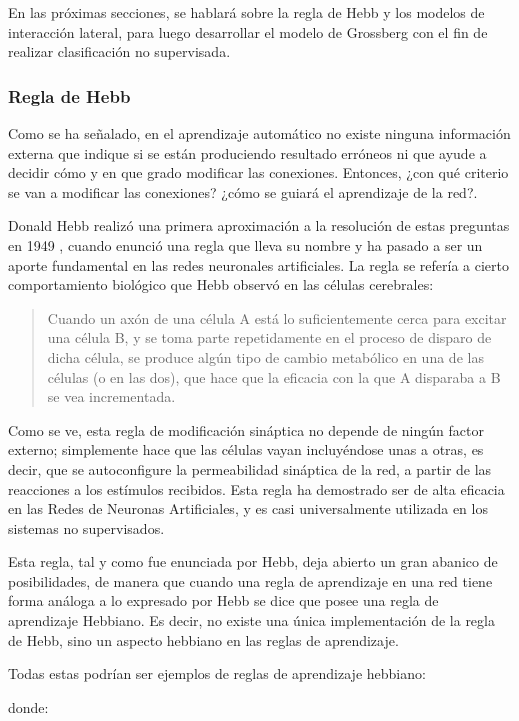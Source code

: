 En las próximas secciones, se hablará sobre la regla de Hebb y los modelos de interacción lateral, para luego desarrollar el modelo de Grossberg con el fin de realizar clasificación no supervisada. 

\subsubsection{Regla de Hebb}

Como se ha señalado, en el aprendizaje automático no existe ninguna información externa que indique si se están produciendo resultado erróneos ni que ayude a decidir cómo y en que grado modificar las conexiones. Entonces, ¿con qué criterio se van a modificar las conexiones? ¿cómo se guiará el aprendizaje de la red?.

Donald Hebb realizó una primera aproximación a la resolución de estas preguntas en 1949 \cite{hebb2002}, cuando enunció una regla que lleva su nombre y ha pasado a ser un aporte fundamental en las redes neuronales artificiales. La regla se refería a cierto comportamiento biológico que Hebb observó en las células cerebrales:

\begin{quotation}
Cuando un axón de una célula A está lo suficientemente cerca para excitar una célula B, y se toma parte repetidamente en el proceso de disparo de dicha célula, se produce algún tipo de cambio metabólico en una de las células (o en las dos), que hace que la eficacia con la que A disparaba a B se vea incrementada.
\end{quotation}

Como se ve, esta regla de modificación sináptica no depende de ningún factor externo; simplemente hace que las células vayan incluyéndose unas a otras, es decir, que se autoconfigure la permeabilidad sináptica de la red, a partir de las reacciones a los estímulos recibidos. Esta regla ha demostrado ser de alta eficacia en las Redes de Neuronas Artificiales, y es casi universalmente utilizada en los sistemas no supervisados.

Esta regla, tal y como fue enunciada por Hebb, deja abierto un gran abanico de posibilidades, de manera que cuando una regla de aprendizaje en una red tiene forma análoga a lo expresado por Hebb se dice que posee una regla de aprendizaje Hebbiano. Es decir, no existe una única implementación de la regla de Hebb, sino un aspecto hebbiano en las reglas de aprendizaje. 

Todas estas podrían ser ejemplos de reglas de aprendizaje hebbiano:

donde:

